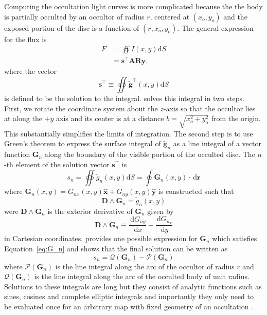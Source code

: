 \documentclass[12pt,dvipsnames]{report}
\newcommand{\ud}{\,\mathrm{d}}
\begin{document}
Computing the occultation light curves is more complicated because the the body
is partially occulted by an occultor of radius $r$, centered at $(x_o, y_o)$
and the exposed portion of the disc is a function of $(r, x_o, y_o)$. The
general expression for the flux is
\begin{align}
    F & =\oiint I(x, y) \mathrm{d} S                              \\
      & =\mathbf{s}^\intercal  \mathbf{A} \mathbf{R} \mathbf{y} .
\end{align}
where the vector
\begin{equation}
    \mathbf{s}^\intercal \equiv \oiint \tilde{\mathbf{g}}^{\intercal}(x, y) \mathrm{d} S
\end{equation}
is defined to be the solution to the integral.
\citet{2019AJ....157...64L} solves this integral in two steps.  First, we rotate
the coordinate system about the  $z$-axis  so that the occultor lies at along the
$+y$ axis and its center is at
a distance $b=\sqrt{x_o^{2}+y_o^{2}}$ from the origin. This substantially simplifies
the limits of integration.
The second step is to use Green's theorem to express the surface integral of
$\tilde{\mathbf{g}}_n$ as a line integral of a vector function $\mathbf{G}_n$
along the boundary of the visible portion of the occulted disc.
The $n$-th element of the solution vector $\mathbf{s}^\intercal$ is
\begin{equation}
    s_{n}=\oiint \tilde{g}_{n}(x, y) \mathrm{d} S=\oint \mathbf{G}_{n}(x, y) \cdot \ud \mathbf{r}
\end{equation}
where
$\mathbf{G}_{n}(x, y)=G_{n x}(x, y) \hat{\mathbf{x}}+G_{n y}(x, y) \hat{\mathbf{y}}$
is constructed such that
\begin{equation}
    \mathbf{D} \wedge \mathbf{G}_{n}=\tilde{g}_{n}(x, y)
    \label{eq:G_n}
\end{equation}
were $\mathbf{D} \wedge \mathbf{G}_{n}$ is the exterior derivative of $\mathbf{G}_n$
given by
\begin{equation}
    \mathbf{D} \wedge \mathbf{G}_{n} \equiv \frac{\ud G_{n y}}{\ud x}-\frac{\ud G_{n_{x}}}{\ud y}
\end{equation}
in Cartesian coordinates.
\citet{2019AJ....157...64L} provides one possible expression for $\mathbf{G}_n$
which satisfies Equation~\ref{eq:G_n} and shows that the final solution can be written as
\begin{equation}
    s_{n}=\mathcal{Q}\left(\mathbf{G}_{n}\right)-\mathcal{P}\left(\mathbf{G}_{n}\right)
\end{equation}
where $\mathcal{P}(\mathbf{G}_n)$ is the  line integral along the arc of the occultor
of radius $r$ and $\mathcal{Q}(\mathbf{G}_n)$ is the line integral along the arc of the
occulted body of unit radius. Solutions to these integrals are long but they consist of
analytic functions such as sines, cosines and complete elliptic integrals and importantly
they only need to be evaluated once for an arbitrary map with fixed geometry of an
occultation \citep{2019AJ....157...64L}.
\end{document}
